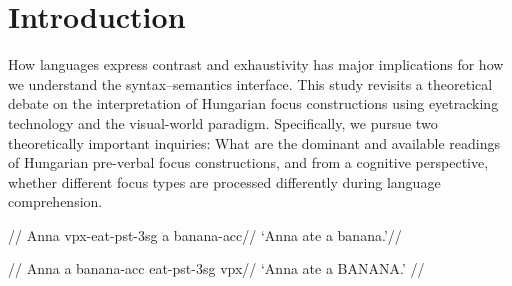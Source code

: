 \documentclass[ruler]{CUP-JNL-LIN}%
\begin{document}










\section{Introduction}

How languages express contrast and exhaustivity has major implications for how we understand the syntax--semantics interface. This study revisits a theoretical debate on the interpretation of Hungarian focus constructions using eyetracking technology and the visual-world paradigm. Specifically, we pursue two theoretically important inquiries: What are the dominant and available readings of Hungarian pre-verbal focus constructions, and from a cognitive perspective, whether different focus types are processed differently during language comprehension. 

\pex[everygla={},aboveglftskip=0em,interpartskip=0pt]
\begingl \label{ex:neutral}
//
\glb Anna{\sc [nom]} {\sc vpx}-eat-{\sc pst-3sg} a banana-{\sc acc}//
\glft `Anna ate a banana.'//
\endgl
\xe

\vspace{-12px}

\pex[everygla={},aboveglftskip=0em,interpartskip=0pt]
\begingl \label{ex:pvf}
//
\glb Anna{\sc [nom]} a banana-{\sc acc} eat-{\sc pst-3sg} {\sc vpx}//
\glft `Anna ate a BANANA.' //
\endgl
\xe
\end{document}

